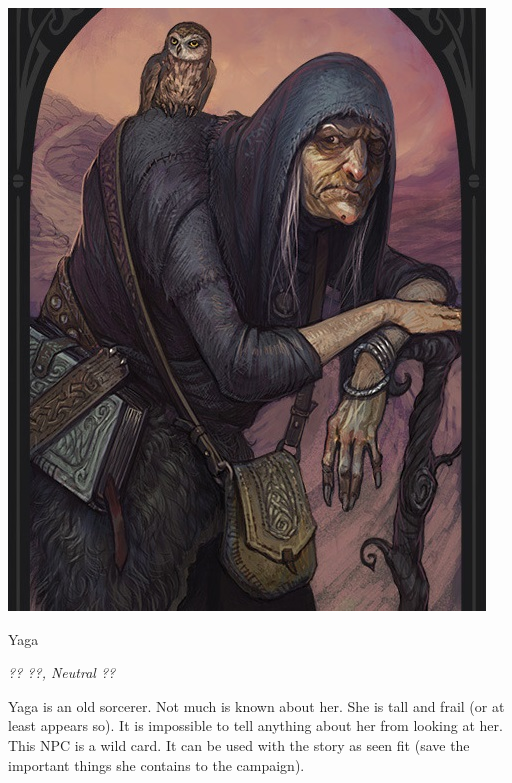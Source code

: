 \begin{center}
	\includegraphics[width=0.5\linewidth]{img/Yaga.jpg}
\end{center}

\begin{monsterbox}{Yaga}
	\begin{hangingpar}
		\textit{?? ??, Neutral ??}
	\end{hangingpar}
	\dndline%
	\basics[%
	armorclass = ??,
	hitpoints  = ??,
	speed      = ?? ft
	]
	\dndline%
	\stats[
	STR = \stat{}, %
	DEX = \stat{},
	CON = \stat{},
	INT = \stat{},
	WIS = \stat{},
	CHA = \stat{}
	]
	\dndline%
	\details[%
	languages = {Common},
	challenge = 20
	]
	\dndline%
	Yaga is an old sorcerer. Not much is known about her. She is tall and frail (or at least appears so). It is impossible to tell anything about her from looking at her. This NPC is a wild card. It can be used with the story as seen fit (save the important things she contains to the campaign).
\end{monsterbox}

